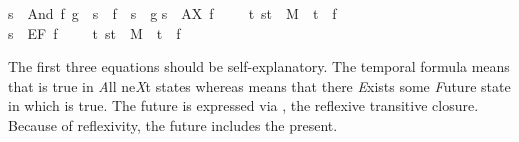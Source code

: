 \begin{isabellebody}
{\isachardoublequote}s\ {\isasymTurnstile}\ And\ f\ g\ {\isacharequal}\ {\isacharparenleft}s\ {\isasymTurnstile}\ f\ {\isasymand}\ s\ {\isasymTurnstile}\ g{\isacharparenright}{\isachardoublequote}\isanewline
{\isachardoublequote}s\ {\isasymTurnstile}\ AX\ f\ \ \ \ {\isacharequal}\ {\isacharparenleft}{\isasymforall}t{\isachardot}\ {\isacharparenleft}s{\isacharcomma}t{\isacharparenright}\ {\isasymin}\ M\ {\isasymlongrightarrow}\ t\ {\isasymTurnstile}\ f{\isacharparenright}{\isachardoublequote}\isanewline
{\isachardoublequote}s\ {\isasymTurnstile}\ EF\ f\ \ \ \ {\isacharequal}\ {\isacharparenleft}{\isasymexists}t{\isachardot}\ {\isacharparenleft}s{\isacharcomma}t{\isacharparenright}\ {\isasymin}\ M\isactrlsup {\isacharasterisk}\ {\isasymand}\ t\ {\isasymTurnstile}\ f{\isacharparenright}{\isachardoublequote}\isamarkupfalse%
%
\begin{isamarkuptext}%
\noindent
The first three equations should be self-explanatory. The temporal formula
 means that  is true in \emph{A}ll ne\emph{X}t states whereas
 means that there \emph{E}xists some \emph{F}uture state in which  is
true. The future is expressed via \isa{\isactrlsup {\isacharasterisk}}, the reflexive transitive
closure. Because of reflexivity, the future includes the present.


\end{isamarkuptext}
\end{isabellebody}
